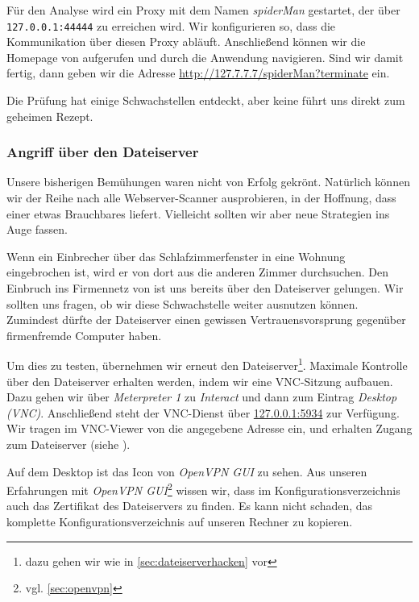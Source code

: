 
Für den Analyse wird ein Proxy mit dem Namen \emph{spiderMan} gestartet, der
über \texttt{127.0.0.1:44444} zu erreichen wird. Wir konfigurieren \Firefox{}
so, dass die Kommunikation über diesen Proxy abläuft. Anschließend können wir
die Homepage von \Mayerbrot{} aufgerufen und durch die Anwendung
navigieren. Sind wir damit fertig, dann geben wir die Adresse
\url{http://127.7.7.7/spiderMan?terminate} ein.

Die Prüfung hat einige Schwachstellen entdeckt, aber keine führt uns direkt zum
geheimen Rezept.


\subsubsection{Angriff über den Dateiserver}

Unsere bisherigen Bemühungen waren nicht von Erfolg gekrönt. Natürlich können
wir der Reihe nach alle Webserver-Scanner ausprobieren, in der Hoffnung, dass
einer etwas Brauchbares liefert. Vielleicht sollten wir aber neue Strategien ins
Auge fassen.

Wenn ein Einbrecher über das Schlafzimmerfenster in eine Wohnung eingebrochen
ist, wird er von dort aus die anderen Zimmer durchsuchen. Den Einbruch ins
Firmennetz von \Mayerbrot{} ist uns bereits über den Dateiserver gelungen. Wir
sollten uns fragen, ob wir diese Schwachstelle weiter ausnutzen
können. Zumindest dürfte der Dateiserver einen gewissen Vertrauensvorsprung
gegenüber firmenfremde Computer haben.

Um dies zu testen, übernehmen wir erneut den Dateiserver\footnote{dazu gehen wir
  wie in \cref{sec:dateiserverhacken} vor}. Maximale Kontrolle über den
Dateiserver erhalten werden, indem wir eine VNC-Sitzung aufbauen. Dazu gehen wir
über \emph{Meterpreter 1} zu \emph{Interact} und dann zum Eintrag \emph{Desktop
  (VNC)}. Anschließend steht der VNC-Dienst über \url{127.0.0.1:5934} zur
Verfügung. Wir tragen im VNC-Viewer von \Metasploit{} die angegebene Adresse
ein, und erhalten Zugang zum Dateiserver (siehe ).


Auf dem Desktop ist das Icon von \emph{OpenVPN GUI} zu sehen. Aus unseren
Erfahrungen mit \emph{OpenVPN GUI}\footnote{vgl. \cref{sec:openvpn}} wissen wir,
dass im Konfigurationsverzeichnis auch das Zertifikat des Dateiservers zu
finden. Es kann nicht schaden, das komplette Konfigurationsverzeichnis auf
unseren Rechner zu kopieren.

